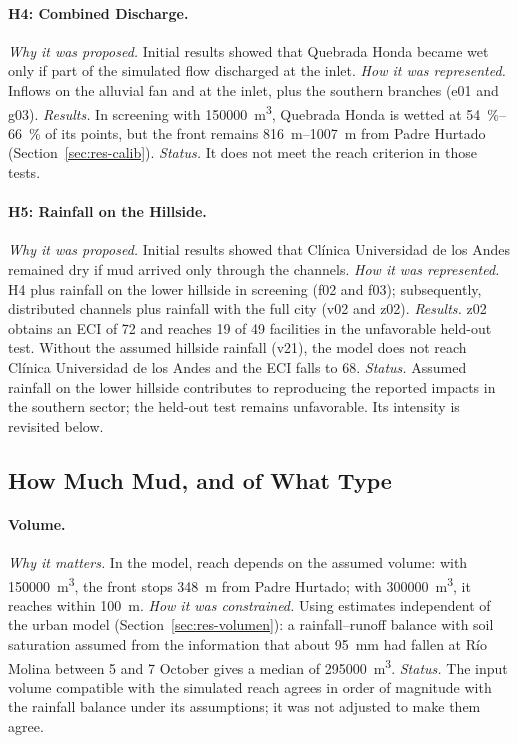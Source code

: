 \paragraph{H4: Combined Discharge.} \emph{Why it was proposed.} Initial results showed that Quebrada Honda became wet only if part of the simulated flow discharged at the inlet. \emph{How it was represented.} Inflows on the alluvial fan and at the inlet, plus the southern branches (e01 and g03). \emph{Results.} In screening with \SI{150000}{m^3}, Quebrada Honda is wetted at \SIrange{54}{66}{\percent} of its points, but the front remains \SIrange{816}{1007}{m} from Padre Hurtado (Section~\ref{sec:res-calib}). \emph{Status.} It does not meet the reach criterion in those tests.

\paragraph{H5: Rainfall on the Hillside.} \emph{Why it was proposed.} Initial results showed that Clínica Universidad de los Andes remained dry if mud arrived only through the channels. \emph{How it was represented.} H4 plus rainfall on the lower hillside in screening (f02 and f03); subsequently, distributed channels plus rainfall with the full city (v02 and z02). \emph{Results.} z02 obtains an ECI of 72 and reaches 19 of 49 facilities in the unfavorable held-out test. Without the assumed hillside rainfall (v21), the model does not reach Clínica Universidad de los Andes and the ECI falls to 68. \emph{Status.} Assumed rainfall on the lower hillside contributes to reproducing the reported impacts in the southern sector; the held-out test remains unfavorable. Its intensity is revisited below.

\subsection{How Much Mud, and of What Type}
\paragraph{Volume.} \emph{Why it matters.} In the model, reach depends on the assumed volume: with \SI{150000}{m^3}, the front stops \SI{348}{m} from Padre Hurtado; with \SI{300000}{m^3}, it reaches within \SI{100}{m}. \emph{How it was constrained.} Using estimates independent of the urban model (Section~\ref{sec:res-volumen}): a rainfall--runoff balance with soil saturation assumed from the information that about \SI{95}{mm} had fallen at Río Molina between 5 and 7 October \citep{cr2_2026} gives a median of \SI{295000}{m^3}. \emph{Status.} The input volume compatible with the simulated reach agrees in order of magnitude with the rainfall balance under its assumptions; it was not adjusted to make them agree.

